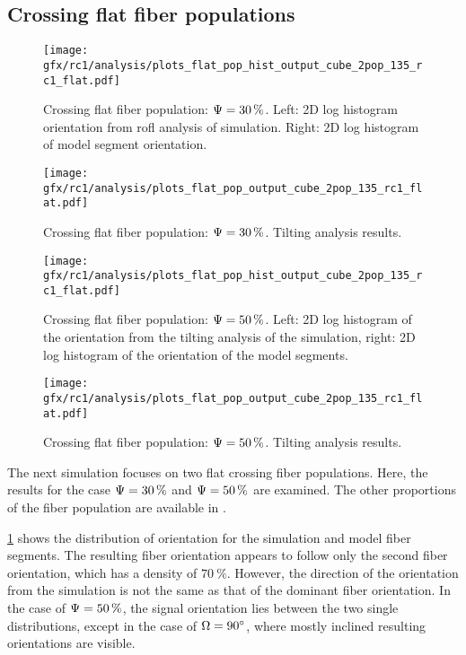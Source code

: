 \subsection{Crossing flat fiber populations}
\label{sec:resCrossFlat}
%
\begin{figure}[!t]
\centering
\texttt{[image: gfx/rc1/analysis/plots\_flat\_pop\_hist\_output\_cube\_2pop\_135\_rc1\_flat.pdf]}
\caption{Crossing flat fiber population: $\textnormal{$\Psi$}=\SI{30}{\percent}$. Left: 2D log histogram orientation from rofl analysis of simulation. Right: 2D log histogram of model segment orientation.}
\label{fig:flat_03_fiber_pop_hist}
\end{figure}
%
\begin{figure}[!p]
\centering
\texttt{[image: gfx/rc1/analysis/plots\_flat\_pop\_output\_cube\_2pop\_135\_rc1\_flat.pdf]}
\caption{Crossing flat fiber population: $\textnormal{$\Psi$}=\SI{30}{\percent}$. Tilting analysis results. }
\label{fig:flat_03_fiber_pop_rofl}
\end{figure}
%
\begin{figure}[!t]
\centering
\texttt{[image: gfx/rc1/analysis/plots\_flat\_pop\_hist\_output\_cube\_2pop\_135\_rc1\_flat.pdf]}
\caption{Crossing flat fiber population: $\textnormal{$\Psi$}=\SI{50}{\percent}$. Left: 2D log histogram of the orientation from the tilting analysis of the simulation, right: 2D log histogram of the orientation of the model segments.}
\label{fig:flat_05_fiber_pop_hist}
\end{figure}
%
\begin{figure}[!p]
\centering
\texttt{[image: gfx/rc1/analysis/plots\_flat\_pop\_output\_cube\_2pop\_135\_rc1\_flat.pdf]}
\caption{Crossing flat fiber population: $\textnormal{$\Psi$}=\SI{50}{\percent}$. Tilting analysis results.}
\label{fig:flat_05_fiber_pop_rofl}
\end{figure}
%
The next simulation focuses on two flat crossing fiber populations.
Here, the results for the case $\textnormal{$\Psi$} = \SI{30}{\percent}$ and $\textnormal{$\Psi$} = \SI{50}{\percent}$ are examined.
The other proportions of the fiber population are available in .
\par
%
\ref{fig:flat_03_fiber_pop_hist} shows the distribution of orientation for the simulation and model fiber segments.
The resulting fiber orientation appears to follow only the second fiber orientation, which has a density of $\SI{70}{\percent}$.
However, the direction of the orientation from the simulation is not the same as that of the dominant fiber orientation.
In the case of $\textnormal{$\Psi$} = \SI{50}{\percent}$, the signal orientation lies between the two single distributions, except in the case of $\textnormal{$\Omega$} = \SI{90}{\degree}$, where mostly inclined resulting orientations are visible.
